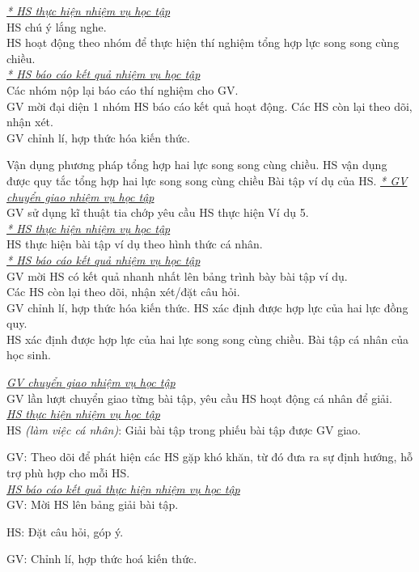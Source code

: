 {\begin{itemize}[label=-]
	\end{itemize}
		\textit{\underline{* HS thực hiện nhiệm vụ học tập}}\\
	HS chú ý lắng nghe.\\
	HS hoạt động theo nhóm để thực hiện thí nghiệm tổng hợp lực song song cùng chiều.\\
		\textit{\underline{* HS báo cáo kết quả nhiệm vụ học tập}}\\
	Các nhóm nộp lại báo cáo thí nghiệm cho GV.\\
	GV mời đại diện 1 nhóm HS báo cáo kết quả hoạt động. Các HS còn lại theo dõi, nhận xét.\\
	GV chỉnh lí, hợp thức hóa kiến thức.
}
\hoatdong
{Vận dụng phương pháp tổng hợp hai lực song song cùng chiều.
}
{HS vận dụng được quy tắc tổng hợp hai lực song song cùng chiều
}
{Bài tập ví dụ của HS.
}
{\textit{\underline{* GV chuyển giao nhiệm vụ học tập}}\\
	GV sử dụng kĩ thuật tia chớp yêu cầu HS thực hiện Ví dụ 5.\\
	\textit{\underline{* HS thực hiện nhiệm vụ học tập}}\\
	HS thực hiện bài tập ví dụ theo hình thức cá nhân.\\
	\textit{\underline{* HS báo cáo kết quả nhiệm vụ học tập}}\\
	GV mời HS có kết quả nhanh nhất lên bảng trình bày bài tập ví dụ.\\
	Các HS còn lại theo dõi, nhận xét/đặt câu hỏi.\\
	GV chỉnh lí, hợp thức hóa kiến thức.
}
{
	HS xác định được hợp lực của hai lực đồng quy.\\
	HS xác định được hợp lực của hai lực song song cùng chiều.
}
{
	Bài tập cá nhân của học sinh.
}
{
	\textit{\underline{GV chuyển giao nhiệm vụ học tập}}\\
	GV lần lượt chuyển giao từng bài tập, yêu cầu HS hoạt động cá nhân để giải.\\
	\textit{\underline{HS thực hiện nhiệm vụ học tập}}\\
	HS \textit{(làm việc cá nhân)}:  Giải bài tập trong phiếu bài tập được GV giao. 
	
	GV: Theo dõi để phát hiện các HS gặp khó khăn, từ đó đưa ra sự định hướng, hỗ trợ phù hợp cho mỗi HS.\\
	\textit{\underline{HS báo cáo kết quả thực hiện nhiệm vụ học tập}}\\
	GV: Mời HS lên bảng giải bài tập.
	
	HS: Đặt câu hỏi, góp ý.
	
	GV: Chỉnh lí, hợp thức hoá kiến thức.
}
